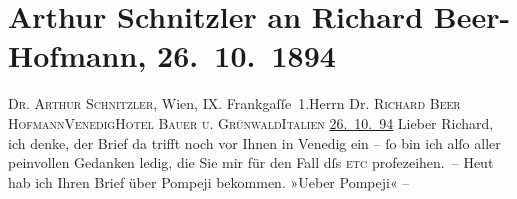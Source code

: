 

         
         \renewcommand{\erwaehntePersonen}{Personen: Richard Beer-Hofmann, Paul Scarron, Friedrich von Schiller}
         \renewcommand{\erwaehnteOrte}{Orte: Frankgasse, Grand Hotel Bauer-Grünwald, I., Innere Stadt, Italien, Pompei, Rom, Venedig, Volkstheater, Wien}
         \renewcommand{\erwaehnteWerke}{Werke: Anatol, Comödianten, Der Komödianten-Roman, Kabale und Liebe, Liebelei. Schauspiel in drei Akten, Sterben. Novelle}
               \section[Arthur Schnitzler an Richard Beer-Hofmann, 26. 10. 1894]{ Arthur Schnitzler an Richard Beer-Hofmann, 26. 10. 1894}\nopagebreak{}\rehead{ }\begin{ledgroupsized}[t]{13cm}\normalsize\beginnumbering \toendnotes[C]{\smallbreak\pagebreak[2]} 
\toendnotes[C]{\smallbreak}\pstart{}{\pb}\textsc{Dr. Arthur Schnitzler}, Wien, IX. Frankgaſſe 1.\pend{}{\bigskip}\pstart{}Herrn Dr. \textsc{Richard Beer Hofmann}\pend{}\pstart{}\textsc{Venedig}\pend{}\pstart{}\textsc{Hotel Bauer u. Grünwald}\pend{}\pstart{}\textsc{Italien}\pend{}{\bigskip}\pstart
           \raggedleft{}{\pb}\uline{26. 10. 94}\pend
           \pstart
           Lieber Richard, ich denke, der Brief da trifft noch vor Ihnen in Venedig ein – ſo bin ich alſo aller peinvollen
               Gedanken ledig, die Sie mir für den Fall dſs \textsc{etc}
               profezeihen. – Heut hab ich Ihren Brief über Pompeji bekommen. »Ueber Pompeji« –

\end{ledgroupsized}
